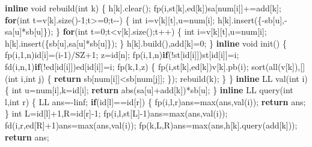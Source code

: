 \documentclass[
]{article}
\newenvironment{Shaded}{}{}
\newcommand{\ControlFlowTok}[1]{\textcolor[rgb]{0.00,0.44,0.13}{\textbf{#1}}}
\newcommand{\DataTypeTok}[1]{\textcolor[rgb]{0.56,0.13,0.00}{#1}}
\newcommand{\DecValTok}[1]{\textcolor[rgb]{0.25,0.63,0.44}{#1}}
\newcommand{\KeywordTok}[1]{\textcolor[rgb]{0.00,0.44,0.13}{\textbf{#1}}}
\newcommand{\NormalTok}[1]{#1}
\begin{document}
\begin{Shaded}
\begin{Highlighting}[]
\KeywordTok{inline} \DataTypeTok{void}\NormalTok{ rebuild(}\DataTypeTok{int}\NormalTok{ k)}
\NormalTok{\{}
\NormalTok{    h[k].clear(); }
\NormalTok{    fp(i,st[k],ed[k])sa[num[i]]+=add[k];}
    \ControlFlowTok{for}\NormalTok{(}\DataTypeTok{int}\NormalTok{ t=v[k].size(){-}}\DecValTok{1}\NormalTok{;t\textgreater{}=}\DecValTok{0}\NormalTok{;t{-}{-})}
\NormalTok{    \{}
        \DataTypeTok{int}\NormalTok{ i=v[k][t],u=num[i];}
\NormalTok{        h[k].insert(\{{-}sb[u],{-}sa[u]*sb[u]\});}
\NormalTok{    \}}
    \ControlFlowTok{for}\NormalTok{(}\DataTypeTok{int}\NormalTok{ t=}\DecValTok{0}\NormalTok{;t\textless{}v[k].size();t++)}
\NormalTok{    \{}
        \DataTypeTok{int}\NormalTok{ i=v[k][t],u=num[i];}
\NormalTok{        h[k].insert(\{sb[u],sa[u]*sb[u]\});}
\NormalTok{    \}}
\NormalTok{    h[k].build(),add[k]=}\DecValTok{0}\NormalTok{;}
\NormalTok{\}}
\KeywordTok{inline} \DataTypeTok{void}\NormalTok{ init()}
\NormalTok{\{}
\NormalTok{    fp(i,}\DecValTok{1}\NormalTok{,n)id[i]=(i{-}}\DecValTok{1}\NormalTok{)/SZ+}\DecValTok{1}\NormalTok{; z=id[n];}
\NormalTok{    fp(i,}\DecValTok{1}\NormalTok{,n)}\ControlFlowTok{if}\NormalTok{(!st[id[i]])st[id[i]]=i;}
\NormalTok{    fd(i,n,}\DecValTok{1}\NormalTok{)}\ControlFlowTok{if}\NormalTok{(!ed[id[i]])ed[id[i]]=i;}
\NormalTok{    fp(k,}\DecValTok{1}\NormalTok{,z)}
\NormalTok{    \{}
\NormalTok{        fp(i,st[k],ed[k])v[k].pb(i);}
\NormalTok{        sort(all(v[k]),[](}\DataTypeTok{int}\NormalTok{ i,}\DataTypeTok{int}\NormalTok{ j)}
\NormalTok{        \{}
            \ControlFlowTok{return}\NormalTok{ sb[num[i]]\textless{}sb[num[j]];}
\NormalTok{        \});}
\NormalTok{        rebuild(k);}
\NormalTok{    \}}
\NormalTok{\}}
\KeywordTok{inline}\NormalTok{ LL val(}\DataTypeTok{int}\NormalTok{ i)}
\NormalTok{\{}
    \DataTypeTok{int}\NormalTok{ u=num[i],k=id[i];}
    \ControlFlowTok{return}\NormalTok{ abs(sa[u]+add[k])*sb[u];}
\NormalTok{\}}
\KeywordTok{inline}\NormalTok{ LL query(}\DataTypeTok{int}\NormalTok{ l,}\DataTypeTok{int}\NormalTok{ r)}
\NormalTok{\{}
\NormalTok{    LL ans={-}linf;}
    \ControlFlowTok{if}\NormalTok{(id[l]==id[r])}
\NormalTok{    \{}
\NormalTok{        fp(i,l,r)ans=max(ans,val(i));}
        \ControlFlowTok{return}\NormalTok{ ans;}
\NormalTok{    \}}
    \DataTypeTok{int}\NormalTok{ L=id[l]+}\DecValTok{1}\NormalTok{,R=id[r]{-}}\DecValTok{1}\NormalTok{;}
\NormalTok{    fp(i,l,st[L]{-}}\DecValTok{1}\NormalTok{)ans=max(ans,val(i));}
\NormalTok{    fd(i,r,ed[R]+}\DecValTok{1}\NormalTok{)ans=max(ans,val(i));}
\NormalTok{    fp(k,L,R)ans=max(ans,h[k].query(add[k]));}
    \ControlFlowTok{return}\NormalTok{ ans;}

\end{Highlighting}
\end{Shaded}
\end{document}
